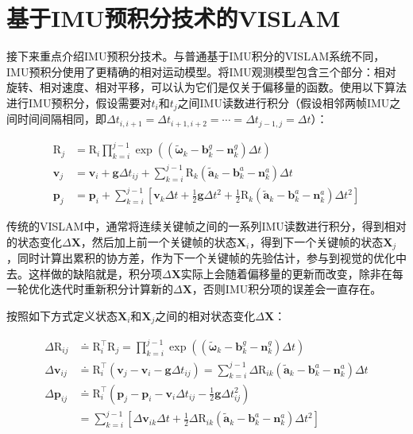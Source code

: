 \section{基于IMU预积分技术的VISLAM}

接下来重点介绍IMU预积分技术\citep{forster2017manifold}。与普通基于IMU积分的VISLAM系统不同，IMU预积分使用了更精确的相对运动模型。将IMU观测模型包含三个部分：相对旋转、相对速度、相对平移，可以认为它们是仅关于偏移量的函数。使用以下算法进行IMU预积分，假设需要对$t_i$和$t_j$之间IMU读数进行积分（假设相邻两帧IMU之间时间间隔相同，即$\Delta t_{i,i+1} = \Delta t_{i+1,i+2} = \cdots = \Delta t_{j-1,j} = \Delta t$）：

\begin{equation}
\begin{aligned}
\mathrm{R}_j &= \mathrm{R}_i \prod_{k=i}^{j-1}
                \exp\left(
                    (\tilde{\bm\omega}_k - \bm{b}_k^g - \bm{n}_k^g) \Delta t
                \right) \\
\bm{v}_j &= \bm{v}_i + \bm{g} \Delta t_{ij} + \sum_{k=i}^{j-1}
\mathrm{R}_k (\tilde{\bm{a}}_k - \bm{b}_k^a - \bm{n}_k^a) \Delta t \\
\bm{p}_j &= \bm{p}_i + \sum_{k=i}^{j-1}
                \left[
                    \bm{v}_k \Delta t +
                    \tfrac{1}{2}\bm{g}\Delta t^2 +
                    \tfrac{1}{2}\mathrm{R}_k
                    (\tilde{\bm a}_k - \bm{b}_k^a - \bm{n}_k^a) \Delta t^2
                \right]
    \end{aligned}
\end{equation}

传统的VISLAM中，通常将连续关键帧之间的一系列IMU读数进行积分，得到相对的状态变化$\Delta\bm X$，然后加上前一个关键帧的状态$\bm{X}_i$，得到下一个关键帧的状态$\bm{X}_j$，同时计算出累积的协方差，作为下一个关键帧的先验估计，参与到视觉的优化中去。这样做的缺陷就是，积分项$\Delta\bm X$实际上会随着偏移量的更新而改变，除非在每一轮优化迭代时重新积分计算新的$\Delta\bm X$，否则IMU积分项的误差会一直存在。

按照如下方式定义状态$\bm{X}_i$和$\bm{X}_j$之间的相对状态变化$\Delta\bm X$：

\begin{equation}
\begin{aligned}
    \Delta\mathrm{R}_{ij}
  &\doteq \mathrm{R}_i^\top \mathrm{R}_j
  = \prod_{k=i}^{j-1}
  \exp\left(
      (\tilde{\bm \omega}_k - \bm{b}_k^g - \bm{n}_k^g) \Delta t
  \right) \\
  \Delta\bm{v}_{ij}
  &\doteq \mathrm{R}_i^\top (\bm{v}_j - \bm{v}_i - \bm{g} \Delta t_{ij})
  = \sum_{k=i}^{j-1}
  \Delta\mathrm{R}_{ik}
  (\tilde{\bm a}_k - \bm{b}_k^a - \bm{n}_k^a) \Delta t \\
  \Delta\bm{p}_{ij}
  &\doteq \mathrm{R}_i^\top
  \left(
      \bm{p}_j - \bm{p}_i -
      \bm{v}_i \Delta t_{ij} -
      \tfrac{1}{2} \bm{g} \Delta t_{ij}^2
  \right) \\
  &=           \sum_{k=i}^{j-1}
  \left[
      \Delta\bm{v}_{ik} \Delta t +
      \tfrac{1}{2} \Delta\mathrm{R}_{ik}
      (\tilde{\bm a}_k - \bm{b}_k^a - \bm{n}_k^a) \Delta t^2
  \right]
\end{aligned}\label{eq:raw_int}
\end{equation}

